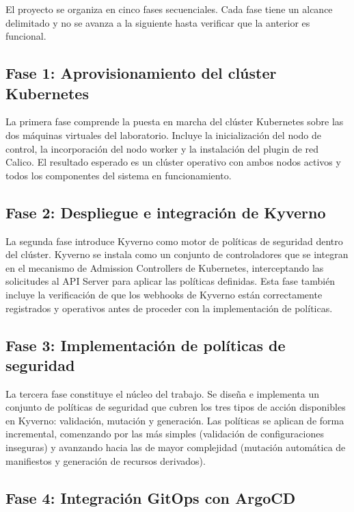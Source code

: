 El proyecto se organiza en cinco fases secuenciales. Cada fase tiene un alcance delimitado y no se avanza a la siguiente hasta verificar que la anterior es funcional.

\subsection{Fase 1: Aprovisionamiento del clúster Kubernetes}

La primera fase comprende la puesta en marcha del clúster Kubernetes sobre las dos máquinas virtuales del laboratorio. Incluye la inicialización del nodo de control, la incorporación del nodo worker y la instalación del plugin de red Calico. El resultado esperado es un clúster operativo con ambos nodos activos y todos los componentes del sistema en funcionamiento.

\subsection{Fase 2: Despliegue e integración de Kyverno}

La segunda fase introduce Kyverno como motor de políticas de seguridad dentro del clúster. Kyverno se instala como un conjunto de controladores que se integran en el mecanismo de Admission Controllers de Kubernetes, interceptando las solicitudes al API Server para aplicar las políticas definidas. Esta fase también incluye la verificación de que los webhooks de Kyverno están correctamente registrados y operativos antes de proceder con la implementación de políticas.

\subsection{Fase 3: Implementación de políticas de seguridad}

La tercera fase constituye el núcleo del trabajo. Se diseña e implementa un conjunto de políticas de seguridad que cubren los tres tipos de acción disponibles en Kyverno: validación, mutación y generación. Las políticas se aplican de forma incremental, comenzando por las más simples (validación de configuraciones inseguras) y avanzando hacia las de mayor complejidad (mutación automática de manifiestos y generación de recursos derivados).

\subsection{Fase 4: Integración GitOps con ArgoCD}

